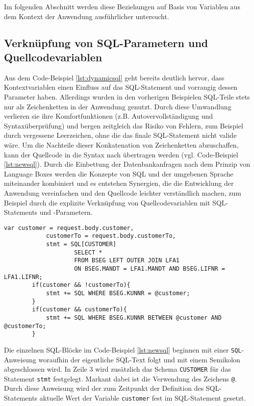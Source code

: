Im folgenden Abschnitt werden diese Beziehungen auf Basis von Variablen aus dem Kontext der Anwendung ausführlicher untersucht.


\subsection{Verkn{\"u}pfung von SQL-Parametern und Quellcodevariablen}\label{sec:sqlandsourcecode}
Aus dem Code-Beispiel \ref{lst:dynamicsql} geht bereits deutlich hervor, dass Kontextvariablen einen Einfluss auf das SQL-Statement und vorrangig dessen Parameter haben.
Allerdings wurden in den vorherigen Beispielen SQL-Teile stets nur als Zeichenketten in der Anwendung genutzt.
Durch diese Umwandlung verlieren sie ihre Komfortfunktionen (z.B. Autovervollständigung und Syntaxüberprüfung) und bergen zeitgleich das Risiko von Fehlern, zum Beispiel durch vergessene Leerzeichen, ohne die das finale SQL-Statement nicht valide wäre.
Um die Nachteile dieser Konkatenation von Zeichenketten abzuschaffen, kann der Quellcode in die Syntax nach \cite{Horschig2014} übertragen werden (vgl. Code-Beispiel \ref{lst:newsql}).
Durch die Einbettung der Datenbankanfragen nach dem Prinzip von Language Boxes \cite{diekmann2013parsing} werden die Konzepte von SQL und der umgebenen Sprache miteinander kombiniert und es entstehen Synergien, die die Entwicklung der Anwendung vereinfachen und den Quellcode leichter verständlich machen, zum Beispiel durch die explizite Verknüpfung von Quellcodevariablen mit SQL-Statements und -Parametern.

	\begin{lstlisting}[caption={Darstellung des Code-Beispiels \ref{lst:dynamicsql} in der Syntax nach \cite{Horschig2014}}, label={lst:newsql}, language=JavaScriptSQL]
		var customer = request.body.customer,
		    customerTo = request.body.customerTo,
		    stmt = SQL[CUSTOMER]
					SELECT *
					FROM BSEG LEFT OUTER JOIN LFA1
					ON BSEG.MANDT = LFA1.MANDT AND BSEG.LIFNR = LFA1.LIFNR;
		if(customer && !customerTo){
			stmt += SQL WHERE BSEG.KUNNR = @customer;
		}
		if(customer && customerTo){
			stmt += SQL WHERE BSEG.KUNNR BETWEEN @customer AND @customerTo;
		}
	\end{lstlisting}

Die einzelnen SQL-Blöcke im Code-Beispiel \ref{lst:newsql} beginnen mit einer \texttt{SQL}-Anweisung woraufhin der eigentliche SQL-Text folgt und mit einem Semikolon abgeschlossen wird.
In Zeile 3 wird zusätzlich das Schema \texttt{CUSTOMER} für das Statement \texttt{stmt} festgelegt.
Markant dabei ist die Verwendung des Zeichens \texttt{@}.
Durch diese Anweisung wird der zum Zeitpunkt der Definition des SQL-Statements aktuelle Wert der Variable \texttt{customer} fest im SQL-Statement gesetzt.

